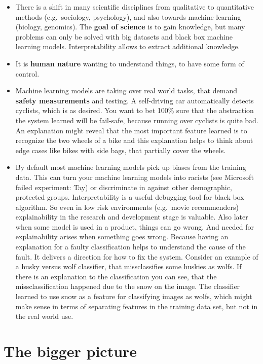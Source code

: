 \documentclass[12pt,]{krantz}
\providecommand{\tightlist}{%
  \setlength{\itemsep}{0pt}\setlength{\parskip}{0pt}}
\theoremstyle{definition}
\theoremstyle{definition}
\theoremstyle{definition}
\theoremstyle{remark}
\begin{document}
\begin{itemize}
\tightlist
\item
  There is a shift in many scientific disciplines from qualitative to
  quantitative methods (e.g.~sociology, psychology), and also towards
  machine learning (biology, genomics). The \textbf{goal of science} is
  to gain knowledge, but many problems can only be solved with big
  datasets and black box machine learning models. Interpretability
  allows to extract additional knowledge.
\item
  It is \textbf{human nature} wanting to understand things, to have some
  form of control.
\item
  Machine learning models are taking over real world tasks, that demand
  \textbf{safety measurements} and testing. A self-driving car
  automatically detects cyclists, which is as desired. You want to bet
  100\% sure that the abstraction the system learned will be fail-safe,
  because running over cyclists is quite bad. An explanation might
  reveal that the most important feature learned is to recognize the two
  wheels of a bike and this explanation helps to think about edge cases
  like bikes with side bags, that partially cover the wheels.
\item
  By default most machine learning models pick up biases from the
  training data. This can turn your machine learning models into racists
  (see Microsoft failed experiment: Tay) or discriminate in against
  other demographic, protected groups. Interpretability is a useful
  debugging tool for black box algorithm. So even in low risk
  environments (e.g.~movie recommenders) explainability in the research
  and development stage is valuable. Also later when some model is used
  in a product, things can go wrong. And needed for explainability
  arises when something goes wrong. Because having an explanation for a
  faulty classification helps to understand the cause of the fault. It
  delivers a direction for how to fix the system. Consider an example of
  a husky versus wolf classifier, that missclassifies some huskies as
  wolfs. If there is an explanation to the classification you can see,
  that the missclassification happened due to the snow on the image. The
  classifier learned to use snow as a feature for classifying images as
  wolfs, which might make sense in terms of separating features in the
  training data set, but not in the real world use. 
\end{itemize}

\section{The bigger picture}\label{the-bigger-picture}
\end{document}

